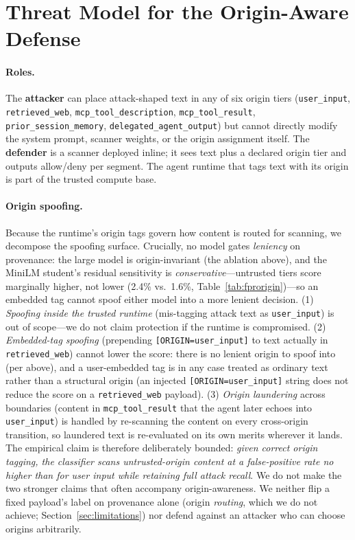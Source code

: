 \documentclass{article}
\begin{document}
\section{Threat Model for the Origin-Aware Defense}
\label{sec:threat-model}

\paragraph{Roles.}
The \textbf{attacker} can place attack-shaped text in any of six origin tiers (\texttt{user\_input}, \texttt{retrieved\_web}, \texttt{mcp\_tool\_description}, \texttt{mcp\_tool\_result}, \texttt{prior\_session\_memory}, \texttt{delegated\_agent\_output}) but cannot directly modify the system prompt, scanner weights, or the origin assignment itself. The \textbf{defender} is a scanner deployed inline; it sees text plus a declared origin tier and outputs allow/deny per segment. The agent runtime that tags text with its origin is part of the trusted compute base.

\paragraph{Origin spoofing.}
Because the runtime's origin tags govern how content is routed for scanning, we decompose the spoofing surface. Crucially, no model gates \emph{leniency} on provenance: the large model is origin-invariant (the ablation above), and the MiniLM student's residual sensitivity is \emph{conservative}---untrusted tiers score marginally higher, not lower (2.4\% vs.\ 1.6\%, Table~\ref{tab:fprorigin})---so an embedded tag cannot spoof either model into a more lenient decision. (1) \emph{Spoofing inside the trusted runtime} (mis-tagging attack text as \texttt{user\_input}) is out of scope---we do not claim protection if the runtime is compromised. (2) \emph{Embedded-tag spoofing} (prepending \texttt{[ORIGIN=user\_input]} to text actually in \texttt{retrieved\_web}) cannot lower the score: there is no lenient origin to spoof into (per above), and a user-embedded tag is in any case treated as ordinary text rather than a structural origin (an injected \texttt{[ORIGIN=user\_input]} string does not reduce the score on a \texttt{retrieved\_web} payload). (3) \emph{Origin laundering} across boundaries (content in \texttt{mcp\_tool\_result} that the agent later echoes into \texttt{user\_input}) is handled by re-scanning the content on every cross-origin transition, so laundered text is re-evaluated on its own merits wherever it lands. The empirical claim is therefore deliberately bounded: \emph{given correct origin tagging, the classifier scans untrusted-origin content at a false-positive rate no higher than for user input while retaining full attack recall}. We do not make the two stronger claims that often accompany origin-awareness. We neither flip a fixed payload's label on provenance alone (origin \emph{routing}, which we do not achieve; Section~\ref{sec:limitations}) nor defend against an attacker who can choose origins arbitrarily.
\end{document}
